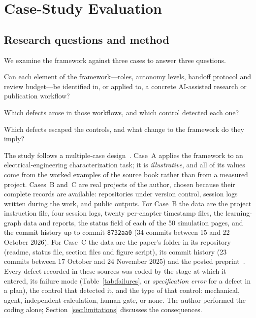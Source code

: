 \section{Case-Study Evaluation}
\label{sec:cases}

\subsection{Research questions and method}
\label{sec:method}

We examine the framework against three cases to answer three questions.
\begin{description}[leftmargin=1.2em,style=nextline]
  \item[RQ1 (coverage)] Can each element of the framework---roles, autonomy levels,
    handoff protocol and review budget---be identified in, or applied to, a concrete
    AI-assisted research or publication workflow?
  \item[RQ2 (detection)] Which defects arose in those workflows, and which control
    detected each one?
  \item[RQ3 (escape)] Which defects escaped the controls, and what change to the
    framework do they imply?
\end{description}

The study follows a multiple-case design~\cite{yin2018case}. Case~A applies the framework
to an electrical-engineering characterization task; it is \emph{illustrative}, and all
of its values come from the worked examples of the source book rather than from a
measured project. Cases~B and~C are real projects of the author, chosen because their
complete records are available: repositories under version control, session logs written
during the work, and public outputs. For Case~B the data are the project instruction
file, four session logs, twenty per-chapter timestamp files, the learning-graph data and
reports, the status field of each of the 50 simulation pages, and the commit history up to
commit \texttt{8732aa0} (34 commits between 15 and 22 October 2026). For Case~C the data are the paper's folder in
its repository (readme, status file, section files and figure script), its commit
history (23 commits between 17 October and 24 November 2025) and the posted
preprint~\cite{lockhart2025microsims}. Every defect recorded in these sources was coded
by the stage at which it entered, its failure mode (Table~\ref{tab:failures}, or
\textit{specification error} for a defect in a plan), the control that detected it, and
the type of that control: mechanical, agent, independent calculation, human gate, or
none. The author performed the coding alone; Section~\ref{sec:limitations} discusses the
consequences.

